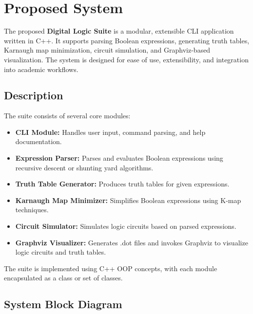 \section{Proposed System}
The proposed \textbf{Digital Logic Suite} is a modular, extensible CLI application written in C++. It supports parsing Boolean expressions, generating truth tables, Karnaugh map minimization, circuit simulation, and Graphviz-based visualization. The system is designed for ease of use, extensibility, and integration into academic workflows.

\vspace{0.5em}

\subsection{Description}
The suite consists of several core modules:
\begin{itemize}
    \item \textbf{CLI Module:} Handles user input, command parsing, and help documentation.
    \item \textbf{Expression Parser:} Parses and evaluates Boolean expressions using recursive descent or shunting yard algorithms.
    \item \textbf{Truth Table Generator:} Produces truth tables for given expressions.
    \item \textbf{Karnaugh Map Minimizer:} Simplifies Boolean expressions using K-map techniques.
    \item \textbf{Circuit Simulator:} Simulates logic circuits based on parsed expressions.
    \item \textbf{Graphviz Visualizer:} Generates .dot files and invokes Graphviz to visualize logic circuits and truth tables.
\end{itemize}
The suite is implemented using C++ OOP concepts, with each module encapsulated as a class or set of classes.

\vspace{0.5em}

\subsection{System Block Diagram}
